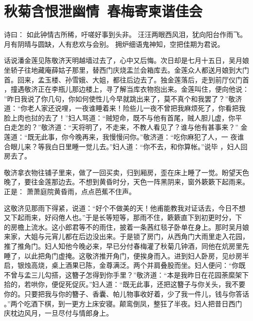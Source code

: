 \chapter{秋菊含恨泄幽情~春梅寄柬谐佳会}

诗曰：
如此钟情古所稀，吁嗟好事到头非。
汪汪两眼西风泪，犹向阳台作雨飞。
月有阴晴与圆缺，人有悲欢与会别。
拥炉细语鬼神知，空把佳期为君说。

话说潘金莲见陈敬济天明越墙过去了，心中又后悔。次日却是七月十五日，吴月娘
坐轿子往地藏庵薛姑子那里，替西门庆烧盂兰会箱库去。金莲众人都送月娘到大门
首。回来，孟玉楼、孙雪娥、大姐，都往后边去了。独金莲落后，走到前厅仪门首
，撞遇敬济正在李瓶儿那边楼上，寻了解当库衣物抱出来。金莲叫住，便向他说：
”昨日我说了你几句，你如何使性儿今早就跳出来了，莫不真个和我罢了？”敬济
道：“你老人家还说哩，一夜谁睡着来！险些儿一夜不曾把我麻烦死了，你看把我
脸上肉也挝的去了！”妇人骂道：“贼短命，既不与他有首尾，贼人胆儿虚，你平
白走怎的？”敬济道：“天将明了，不走来，不教人看见了？谁与他有甚事来？”
金莲道：“既无此事，你今晚再来，我慢慢问你。”敬济道：“吃你麻犯了人，一
夜谁合眼儿来？等我白日里睡一觉儿去。”妇人道：“你不去，和你算帐。”说毕
，妇人回房去了。

敬济拿衣物往铺子里来，做了一回买卖，归到厢房，歪在床上睡了一觉。盼望天色
晚了，要往金莲那边去。不想到黄昏时分，天色一阵黑阴来，窗外簌簌下起雨来。
正是：
萧萧庭院黄昏雨，点点芭蕉不住声。

这敬济见那雨下得紧，说道：“好个不做美的天！他甫能教我对证话去，今日不想
又下起雨来，好闷倦人也。”于是长等短等，那雨不住，簌簌直下到初更时分，下
的房檐上流水。这小郎君等不的雨住，披着一条茜红毯子卧单在身上。那时吴月娘
来家，大姐与元宵儿都在后边没出来。于是锁了房门，从西角门大雨里走入花园，
推了推角门。妇人知他今晚必来，早已分付春梅灌了秋菊几钟酒，同他在炕房里先
睡了，以此把角门虚掩。这敬济推开角门，便挨身而入。进到妇人卧房，见纱房半
启，银烛高烧，桌上酒果已陈，金尊满泛。两个并肩叠股而坐。妇人便问：“你既
不曾与孟三儿勾搭，这簪子怎得到你手里？”敬济道：“本是我昨日在花园荼縻架下
拾的，若哄你，便促死促灰。”妇人道：“既无此事，还把这簪子与你关头，我不要
你的。只要把我与你的簪子、香囊、帕儿物事收好着，少了我一件儿，钱与你答话
。”两个吃酒下棋，到一更方上床安寝。颠鸾倒凤，整狂了半夜。妇人把昔日西门
庆枕边风月，一旦尽付与情郎身上。

